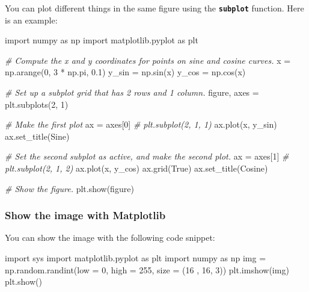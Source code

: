 \documentclass[
]{article}
\newenvironment{Shaded}{}{}
\newcommand{\CommentTok}[1]{\textcolor[rgb]{0.38,0.63,0.69}{\textit{#1}}}
\newcommand{\DecValTok}[1]{\textcolor[rgb]{0.25,0.63,0.44}{#1}}
\newcommand{\FloatTok}[1]{\textcolor[rgb]{0.25,0.63,0.44}{#1}}
\newcommand{\ImportTok}[1]{#1}
\newcommand{\NormalTok}[1]{#1}
\newcommand{\OperatorTok}[1]{\textcolor[rgb]{0.40,0.40,0.40}{#1}}
\newcommand{\StringTok}[1]{\textcolor[rgb]{0.25,0.44,0.63}{#1}}
\newcommand{\VariableTok}[1]{\textcolor[rgb]{0.10,0.09,0.49}{#1}}
\begin{document}
You can plot different things in the same figure using the
\textbf{\texttt{subplot}} function. Here is an example:

\begin{Shaded}
\begin{Highlighting}[]
\ImportTok{import}\NormalTok{ numpy }\ImportTok{as}\NormalTok{ np}
\ImportTok{import}\NormalTok{ matplotlib.pyplot }\ImportTok{as}\NormalTok{ plt}

\CommentTok{\# Compute the x and y coordinates for points on sine and cosine curves.}
\NormalTok{x }\OperatorTok{=}\NormalTok{ np.arange(}\DecValTok{0}\NormalTok{, }\DecValTok{3} \OperatorTok{*}\NormalTok{ np.pi, }\FloatTok{0.1}\NormalTok{)}
\NormalTok{y\_sin }\OperatorTok{=}\NormalTok{ np.sin(x)}
\NormalTok{y\_cos }\OperatorTok{=}\NormalTok{ np.cos(x)}

\CommentTok{\# Set up a subplot grid that has 2 rows and 1 column.}
\NormalTok{figure, axes }\OperatorTok{=}\NormalTok{ plt.subplots(}\DecValTok{2}\NormalTok{, }\DecValTok{1}\NormalTok{)}

\CommentTok{\# Make the first plot}
\NormalTok{ax }\OperatorTok{=}\NormalTok{ axes[}\DecValTok{0}\NormalTok{]  }\CommentTok{\# plt.subplot(2, 1, 1)}
\NormalTok{ax.plot(x, y\_sin)}
\NormalTok{ax.set\_title(}\StringTok{\textquotesingle{}Sine\textquotesingle{}}\NormalTok{)}

\CommentTok{\# Set the second subplot as active, and make the second plot.}
\NormalTok{ax }\OperatorTok{=}\NormalTok{ axes[}\DecValTok{1}\NormalTok{]  }\CommentTok{\# plt.subplot(2, 1, 2)}
\NormalTok{ax.plot(x, y\_cos)}
\NormalTok{ax.grid(}\VariableTok{True}\NormalTok{)}
\NormalTok{ax.set\_title(}\StringTok{\textquotesingle{}Cosine\textquotesingle{}}\NormalTok{)}

\CommentTok{\# Show the figure.}
\NormalTok{plt.show(figure)}
\end{Highlighting}
\end{Shaded}

\hypertarget{show-the-image-with-matplotlib}{%
\subsubsection{Show the image with
Matplotlib}\label{show-the-image-with-matplotlib}}

You can show the image with the following code snippet:

\begin{Shaded}
\begin{Highlighting}[]
\ImportTok{import}\NormalTok{ sys }
\ImportTok{import}\NormalTok{ matplotlib.pyplot }\ImportTok{as}\NormalTok{ plt }
\ImportTok{import}\NormalTok{ numpy }\ImportTok{as}\NormalTok{ np }
\NormalTok{img }\OperatorTok{=}\NormalTok{ np.random.randint(low }\OperatorTok{=}  \DecValTok{0}\NormalTok{, high }\OperatorTok{=}  \DecValTok{255}\NormalTok{, size }\OperatorTok{=}\NormalTok{  (}\DecValTok{16}\NormalTok{ ,  }\DecValTok{16}\NormalTok{,  }\DecValTok{3}\NormalTok{)) }
\NormalTok{plt.imshow(img) }
\NormalTok{plt.show()}
\end{Highlighting}
\end{Shaded}
\end{document}
